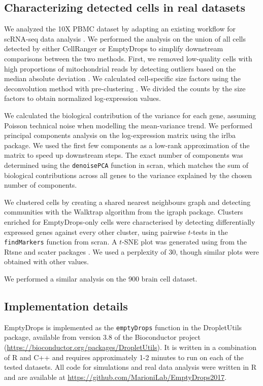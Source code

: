 \documentclass[10pt,letterpaper]{article}
\newcommand{\code}[1]{\texttt{#1}}
\begin{document}
\subsection*{Characterizing detected cells in real datasets}
We analyzed the 10X PBMC dataset by adapting an existing workflow for scRNA-seq data analysis \cite{lun2016stepbystep}.
We performed the analysis on the union of all cells detected by either CellRanger or EmptyDrops to simplify downstream comparisons between the two methods.
First, we removed low-quality cells with high proportions of mitochondrial reads by detecting outliers based on the median absolute deviation \cite{mccarthy2017scater}.
We calculated cell-specific size factors using the deconvolution method with pre-clustering \cite{lun2016pooling}.
We divided the counts by the size factors to obtain normalized log-expression values.

We calculated the biological contribution of the variance for each gene, assuming Poisson technical noise when modelling the mean-variance trend.
We performed principal components analysis on the log-expression matrix using the \textsf{irlba} package.
We used the first few components as a low-rank approximation of the matrix to speed up downstream steps.
The exact number of components was determined using the \code{denoisePCA} function in \textsf{scran},
which matches the sum of biological contributions across all genes to the variance explained by the chosen number of components.

We clustered cells by creating a shared nearest neighbours graph \cite{xu2015identification} and detecting communities with the Walktrap algorithm from the \textsf{igraph} package.
Clusters enriched for EmptyDrops-only cells were characterised by detecting differentially expressed genes against every other cluster,
using pairwise $t$-tests in the \code{findMarkers} function from \textsf{scran}.
A $t$-SNE plot \cite{van2008visualizing} was generated using from the \textsf{Rtsne} and \textsf{scater} packages \cite{mccarthy2017scater}.
We used a perplexity of 30, though similar plots were obtained with other values.

We performed a similar analysis on the 900 brain cell dataset.

\subsection*{Implementation details}
EmptyDrops is implemented as the \code{emptyDrops} function in the \textsf{DropletUtils} package, available from version 3.8 of the Bioconductor project (\url{https://bioconductor.org/packages/DropletUtils}).
It is written in a combination of R and C++ and requires approximately 1-2 minutes to run on each of the tested datasets.
All code for simulations and real data analysis were written in R and are available at \url{https://github.com/MarioniLab/EmptyDrops2017}.
\end{document}
